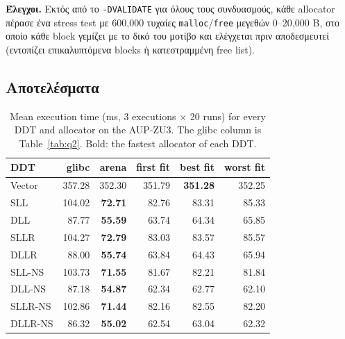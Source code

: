 \documentclass[11pt,a4paper]{article}
\newcommand{\en}[1]{\textlatin{#1}}
\begin{document}
\textbf{Έλεγχοι.} Εκτός από το \en{\texttt{-DVALIDATE}} για όλους τους συνδυασμούς, κάθε \en{allocator} πέρασε ένα \en{stress test} με 600{,}000 τυχαίες \en{\texttt{malloc}}/\en{\texttt{free}} μεγεθών 0--20{,}000 \en{B}, στο οποίο κάθε \en{block} γεμίζει με το δικό του μοτίβο και ελέγχεται πριν αποδεσμευτεί (εντοπίζει επικαλυπτόμενα \en{blocks} ή κατεστραμμένη \en{free list}).

\subsection{Αποτελέσματα}
\begin{table}[H]
\centering
\caption{Mean execution time (ms, 3 executions $\times$ 20 runs) for every DDT and allocator on the AUP-ZU3. The glibc column is Table~\ref{tab:q2}. Bold: the fastest allocator of each DDT.}
\label{tab:q3_time}
\begin{tabular}{@{}lrrrrr@{}}
\toprule
DDT & glibc & arena & first fit & best fit & worst fit \\
\midrule
Vector & 357.28 & 352.30 & 351.79 & \textbf{351.28} & 352.25 \\
SLL & 104.02 & \textbf{72.71} & 82.76 & 83.31 & 85.33 \\
DLL & 87.77 & \textbf{55.59} & 63.74 & 64.34 & 65.85 \\
SLLR & 104.27 & \textbf{72.79} & 83.03 & 83.57 & 85.57 \\
DLLR & 88.00 & \textbf{55.74} & 63.84 & 64.43 & 65.94 \\
SLL-NS & 103.73 & \textbf{71.55} & 81.67 & 82.21 & 81.84 \\
DLL-NS & 87.18 & \textbf{54.87} & 62.34 & 62.77 & 62.10 \\
SLLR-NS & 102.86 & \textbf{71.44} & 82.16 & 82.55 & 82.20 \\
DLLR-NS & 86.32 & \textbf{55.02} & 62.54 & 63.04 & 62.32 \\
\bottomrule
\end{tabular}
\end{table}
\end{document}
